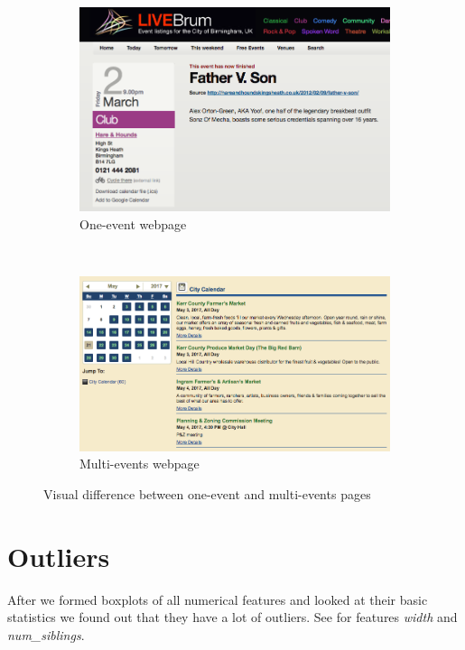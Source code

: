 \begin{figure}[H]
\begin{subfigure}{1\textwidth}
  \centering
  \includegraphics[width=.9\linewidth]{figures06/one_event}
  \caption{One-event webpage}
\end{subfigure} \\
\begin{subfigure}{1\textwidth}
  \centering
  \includegraphics[width=.9\linewidth]{figures06/multi_event}
  \caption{Multi-events webpage}
\end{subfigure}
\caption{Visual difference between one-event and multi-events pages}
\label{fig:onemulti}
\end{figure}



\section{Outliers}
After we formed boxplots of all numerical features and looked at their basic statistics we found out that they have a lot of outliers. See  for features \textit{width} and \textit{num\_siblings}.\\

